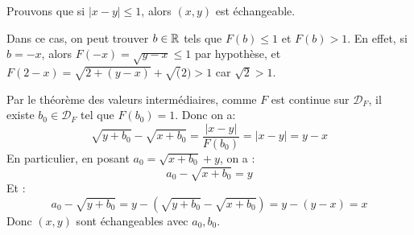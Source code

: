 \documentclass[]{../templates/homework}
\begin{document}
	\subproblem
	Prouvons que si $|x-y| \leq 1$, alors $(x,y)$ est échangeable.
	
	Dans ce cas, on peut trouver $b\in\mathbb R$ tels que $F(b) \leq 1$ et $F(b) > 1$. En effet, si $b=-x$, alors $F(-x) = \sqrt{y-x} \leq 1$ par hypothèse, et $F(2-x) = \sqrt{2+(y-x)} + \sqrt(2) > 1$ car $\sqrt{2} > 1$.
	
	Par le théorème des valeurs intermédiaires, comme $F$ est continue sur $\mathcal D_F$, il existe $b_0 \in \mathcal D_F$ tel que $F(b_0) = 1$. Donc on a:
	\begin{equation*}
		\sqrt{y+b_0} - \sqrt{x+b_0} = \frac{|x-y|}{F(b_0)} = |x-y| = y-x
	\end{equation*}
	En particulier, en posant $a_0 = \sqrt{x+b_0} + y$, on a : $$a_0 - \sqrt{x+b_0} = y$$
	Et :$$a_0 - \sqrt{y+b_0} = y - (\sqrt{y+b_0} - \sqrt{x+b_0}) = y - (y-x) = x$$
	Donc $(x,y)$ sont échangeables avec $a_0, b_0$.
\end{document}
